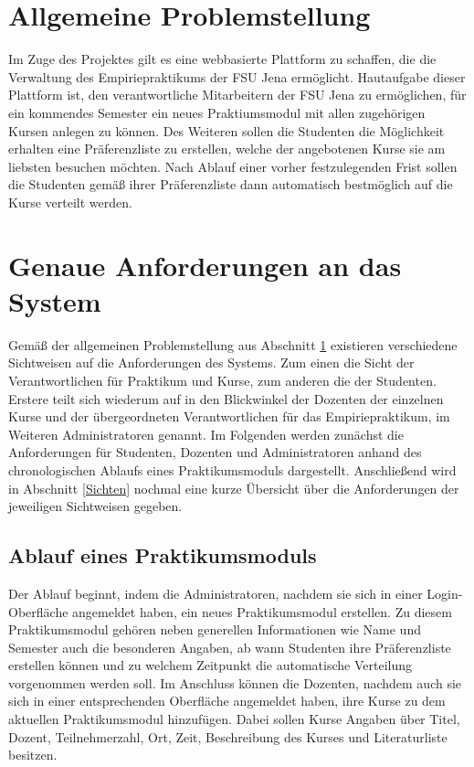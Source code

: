 \section{Allgemeine Problemstellung}
\label{Problemstellung}
    Im Zuge des Projektes gilt es eine webbasierte Plattform zu schaffen, die die Verwaltung des Empiriepraktikums der FSU Jena ermöglicht.
    Hautaufgabe dieser Plattform ist, den verantwortliche Mitarbeitern der FSU Jena zu ermöglichen, für ein kommendes Semester ein neues Praktiumsmodul mit allen zugehörigen Kursen anlegen zu können.
    Des Weiteren sollen die Studenten die Möglichkeit erhalten eine Präferenzliste zu erstellen, welche der angebotenen Kurse sie am liebsten besuchen möchten.
    Nach Ablauf einer vorher festzulegenden Frist sollen die Studenten gemäß ihrer Präferenzliste dann automatisch bestmöglich auf die Kurse verteilt werden.     

\section{Genaue Anforderungen an das System}
    Gemäß der allgemeinen Problemstellung aus Abschnitt \ref{Problemstellung} existieren verschiedene Sichtweisen auf die Anforderungen des Systems.
    Zum einen die Sicht der Verantwortlichen für Praktikum und Kurse, zum anderen die der Studenten.
    Erstere teilt sich wiederum auf in den Blickwinkel der Dozenten der einzelnen Kurse und der übergeordneten Verantwortlichen für das Empiriepraktikum, im Weiteren Administratoren genannt.
    Im Folgenden werden zunächst die Anforderungen für Studenten, Dozenten und Administratoren anhand des chronologischen Ablaufs eines Praktikumsmoduls dargestellt.
    Anschließend wird in Abschnitt \ref{Sichten} nochmal eine kurze Übersicht über die Anforderungen der jeweiligen Sichtweisen gegeben.
    
    \subsection{Ablauf eines Praktikumsmoduls}
        Der Ablauf beginnt, indem die Administratoren, nachdem sie sich in einer Login-Oberfläche angemeldet haben, ein neues Praktikumsmodul erstellen.
        Zu diesem Praktikumsmodul gehören neben generellen Informationen wie Name und Semester auch die besonderen Angaben, ab wann Studenten ihre Präferenzliste erstellen können und zu welchem Zeitpunkt die automatische Verteilung vorgenommen werden soll.
        Im Anschluss können die Dozenten, nachdem auch sie sich in einer entsprechenden Oberfläche angemeldet haben, ihre Kurse zu dem aktuellen Praktikumsmodul hinzufügen.
        Dabei sollen Kurse Angaben über Titel, Dozent, Teilnehmerzahl, Ort, Zeit, Beschreibung des Kurses und Literaturliste besitzen.
                
